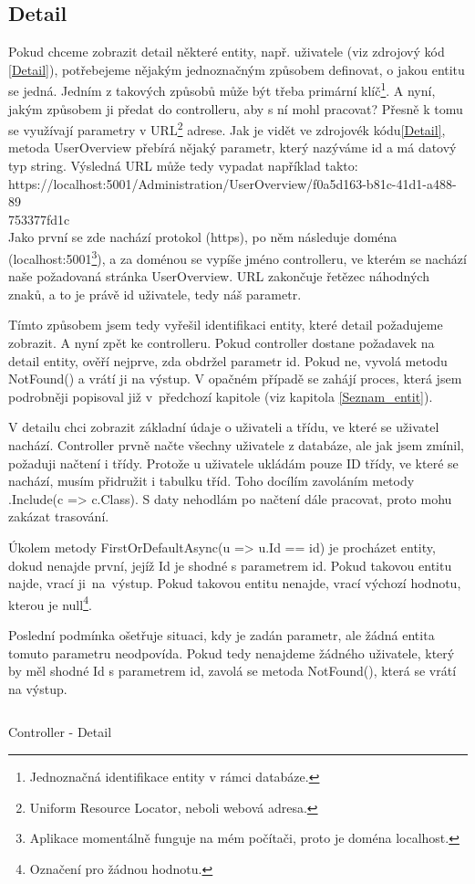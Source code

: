 \documentclass[a4paper, 12pt]{report}
\begin{document}
	\subsection{Detail}
	Pokud chceme zobrazit detail některé entity, např. uživatele (viz zdrojový kód \ref{Detail}), potřebejeme nějakým jednoznačným způsobem definovat, o jakou entitu se jedná. Jedním z takových způsobů může být třeba primární klíč\footnote{Jednoznačná identifikace entity v rámci databáze.}. A nyní, jakým způsobem ji předat do controlleru, aby s ní mohl pracovat? Přesně k tomu se využívají parametry v URL\footnote{Uniform Resource Locator, neboli webová adresa.} adrese. Jak je vidět ve zdrojovék kódu\ref{Detail}, metoda UserOverview přebírá nějaký parametr, který nazýváme id a má datový typ string. Výsledná URL může tedy vypadat například takto: \\
	https://localhost:5001/Administration/UserOverview/f0a5d163-b81c-41d1-a488-89\\753377fd1c\\
	Jako první se zde nachází protokol (https), po něm následuje doména (localhost:5001\footnote{Aplikace momentálně funguje na mém počítači, proto je doména localhost.}), a za doménou se vypíše jméno controlleru, ve kterém se nachází naše požadovaná stránka UserOverview. URL zakončuje řetězec náhodných znaků, a to je právě id uživatele, tedy náš parametr.\par
	Tímto způsobem jsem tedy vyřešil identifikaci entity, které detail požadujeme zobrazit. A nyní zpět ke controlleru. Pokud controller dostane požadavek na detail entity, ověří nejprve, zda obdržel parametr id. Pokud ne, vyvolá metodu NotFound() a vrátí ji na výstup. V opačném případě se zahájí proces, která jsem podrobněji popisoval již v~předchozí kapitole (viz kapitola \ref{Seznam_entit}).\par
	V detailu chci zobrazit základní údaje o uživateli a třídu, ve které se uživatel nachází. Controller prvně načte všechny uživatele z databáze, ale jak jsem zmínil, požaduji načtení i třídy. Protože u uživatele ukládám pouze ID třídy, ve které se nachází, musím přidružit i tabulku tříd. Toho docílím zavoláním metody .Include(c => c.Class). S daty nehodlám po načtení dále pracovat, proto mohu zakázat trasování.\par
	Úkolem metody FirstOrDefaultAsync(u => u.Id == id) je procházet entity, dokud nenajde první, jejíž Id je shodné s parametrem id. Pokud takovou entitu najde, vrací ji~na~výstup. Pokud takovou entitu nenajde, vrací výchozí hodnotu, kterou je null\footnote{Označení pro žádnou hodnotu.}.\par
	Poslední podmínka ošetřuje situaci, kdy je zadán parametr, ale žádná entita tomuto parametru neodpovída. Pokud tedy nenajdeme žádného uživatele, který by měl shodné Id s parametrem id, zavolá se metoda NotFound(), která se vrátí na výstup.
	\begin{listing}[H]
		\inputminted{csharp}{SourceCode/Controllers/Detail.cs}
		\caption{Controller - Detail}
		\label{Detail}
	\end{listing}
\end{document}
